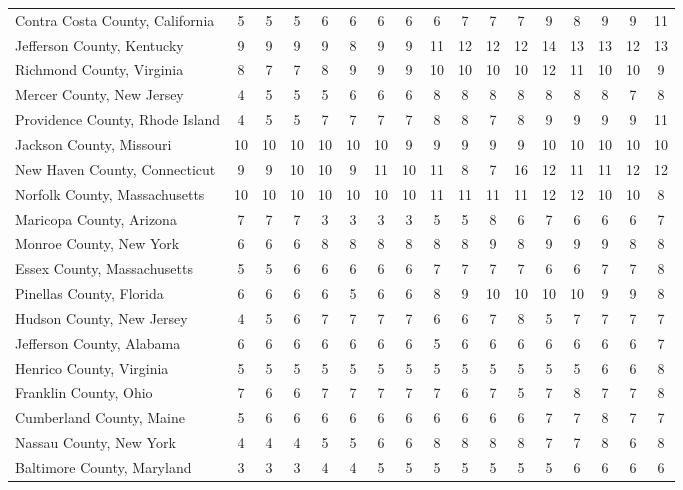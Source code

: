 \begin{landscape}
\begin{longtable}{lcccccccccccccccc}
		Contra Costa County, California & 5 & 5 & 5 & 6 & 6 & 6 & 6 & 6 & 7 & 7 & 7 & 9 & 8 & 9 & 9 & 11 \\
		Jefferson County, Kentucky & 9 & 9 & 9 & 9 & 8 & 9 & 9 & 11 & 12 & 12 & 12 & 14 & 13 & 13 & 12 & 13 \\
		Richmond County, Virginia & 8 & 7 & 7 & 8 & 9 & 9 & 9 & 10 & 10 & 10 & 10 & 12 & 11 & 10 & 10 & 9 \\
		Mercer County, New Jersey & 4 & 5 & 5 & 5 & 6 & 6 & 6 & 8 & 8 & 8 & 8 & 8 & 8 & 8 & 7 & 8 \\
		Providence County, Rhode Island & 4 & 5 & 5 & 7 & 7 & 7 & 7 & 8 & 8 & 7 & 8 & 9 & 9 & 9 & 9 & 11 \\
		Jackson County, Missouri & 10 & 10 & 10 & 10 & 10 & 10 & 9 & 9 & 9 & 9 & 9 & 10 & 10 & 10 & 10 & 10 \\
		New Haven County, Connecticut & 9 & 9 & 10 & 10 & 9 & 11 & 10 & 11 & 8 & 7 & 16 & 12 & 11 & 11 & 12 & 12 \\
		Norfolk County, Massachusetts & 10 & 10 & 10 & 10 & 10 & 10 & 10 & 11 & 11 & 11 & 11 & 12 & 12 & 10 & 10 & 8 \\
		Maricopa County, Arizona & 7 & 7 & 7 & 3 & 3 & 3 & 3 & 5 & 5 & 8 & 6 & 7 & 6 & 6 & 6 & 7 \\
		Monroe County, New York & 6 & 6 & 6 & 8 & 8 & 8 & 8 & 8 & 8 & 9 & 8 & 9 & 9 & 9 & 8 & 8 \\
		Essex County, Massachusetts & 5 & 5 & 6 & 6 & 6 & 6 & 6 & 7 & 7 & 7 & 7 & 6 & 6 & 7 & 7 & 8 \\
		Pinellas County, Florida & 6 & 6 & 6 & 6 & 5 & 6 & 6 & 8 & 9 & 10 & 10 & 10 & 10 & 9 & 9 & 8 \\
		Hudson County, New Jersey & 4 & 5 & 6 & 7 & 7 & 7 & 7 & 6 & 6 & 7 & 8 & 5 & 7 & 7 & 7 & 7 \\
		Jefferson County, Alabama & 6 & 6 & 6 & 6 & 6 & 6 & 6 & 5 & 6 & 6 & 6 & 6 & 6 & 6 & 6 & 7 \\
		Henrico County, Virginia & 5 & 5 & 5 & 5 & 5 & 5 & 5 & 5 & 5 & 5 & 5 & 5 & 5 & 6 & 6 & 8 \\
		Franklin County, Ohio & 7 & 6 & 6 & 7 & 7 & 7 & 7 & 7 & 6 & 7 & 5 & 7 & 8 & 7 & 7 & 8 \\
		Cumberland County, Maine & 5 & 6 & 6 & 6 & 6 & 6 & 6 & 6 & 6 & 6 & 6 & 7 & 7 & 8 & 7 & 7 \\
		Nassau County, New York & 4 & 4 & 4 & 5 & 5 & 6 & 6 & 8 & 8 & 8 & 8 & 7 & 7 & 8 & 6 & 8 \\
		Baltimore County, Maryland & 3 & 3 & 3 & 4 & 4 & 5 & 5 & 5 & 5 & 5 & 5 & 5 & 6 & 6 & 6 & 6 \\

\end{longtable}
\end{landscape}
